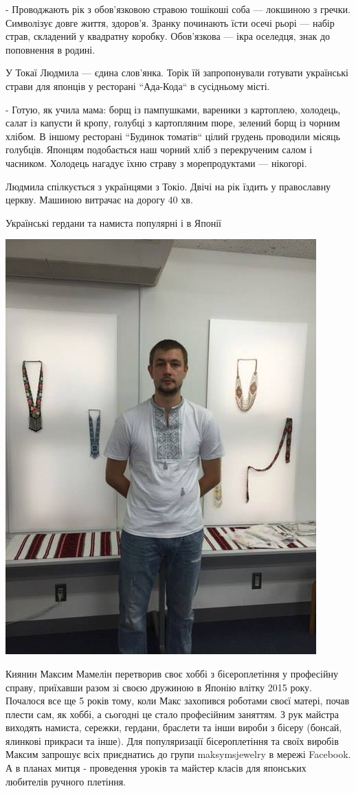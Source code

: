 \documentclass[10pt,a4paper]{article}
\newcommand{\NewsItem}[1]{%
		\usefont{T2A}{iwona}{m}{n} 
		\large #1 \vspace{4pt}
		\par \normalsize \normalfont}
\newcommand{\NewsAuthor}[1]{%
			\hfill \textsc{#1} \vspace{4pt}
			\par \normalfont}
\begin{document}
\begin{multicols}{3}
- Проводжають рік з обов'язковою стравою тошікоші соба — локшиною з гречки. Символізує довге життя, здоров'я. Зранку починають їсти осечі рьорі — набір страв, складений у квадратну коробку. Обов'язкова — ікра оселедця, знак до поповнення в родині.

У Токаї Людмила — єдина слов'янка. Торік їй запропонували готувати українські страви для японців у ресторані ``Ада-Кода`` в сусідньому місті.

- Готую, як учила мама: борщ із пампушками, вареники з картоплею, холодець, салат із капусти й кропу, голубці з картопляним пюре, зелений борщ із чорним хлібом. В іншому ресторані ``Будинок томатів`` цілий грудень проводили місяць голубців. Японцям подобається наш чорний хліб з перекрученим салом і часником. Холодець нагадує їхню страву з морепродуктами — нікогорі.

Людмила спілкується з українцями з Токіо. Двічі на рік їздить у православну церкву. Машиною витрачає на дорогу 40 хв.

\vspace{1cm}

\NewsItem{Українські гердани та намиста популярні і в Японії}
\begin{center}
\includegraphics[width=0.8\linewidth]{images/8}
\end{center}
Киянин Максим Мамелін перетворив своє хоббі з бісероплетіння у професійну справу, приїхавши разом зі своєю дружиною в Японію влітку 2015 року. Почалося все ще 5 років тому, коли Макс захопився роботами своєї матері, почав плести сам, як хоббі, а сьогодні це стало професійним заняттям. З рук майстра виходять намиста, сережки, гердани, браслети та інши вироби з бісеру (бонсай, ялинкові прикраси та інше). Для популяризації бісероплетіння та своїх виробів Максим запрошує всіх приєднатись до групи maksymsjewelry в мережі Facebook. А в планах митця - проведення уроків та майстер класів для японських любителів ручного плетіння.


\end{multicols}
\end{document}
